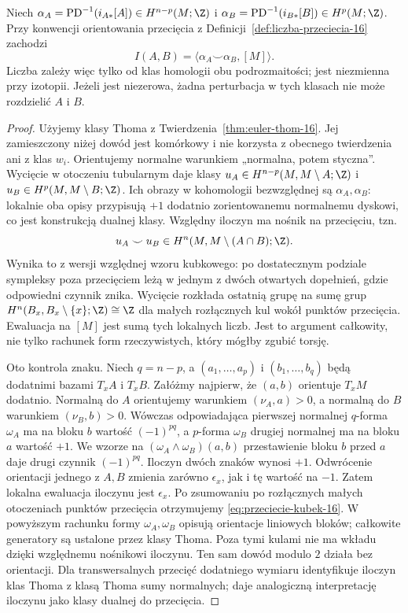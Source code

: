 \begin{twierdzenie}
\label{thm:przeciecie-kubek-16}
Niech $\alpha_A=\operatorname{PD}^{-1}
(i_{A*}[A])\in H^{n-p}(M;\Z)$
i $\alpha_B=\operatorname{PD}^{-1}
(i_{B*}[B])\in H^p(M;\Z)$.
Przy konwencji orientowania przecięcia
z Definicji~\ref{def:liczba-przeciecia-16}
zachodzi
\begin{equation}\label{eq:przeciecie-kubek-16}
 I(A,B)=
 \langle\alpha_A\smile\alpha_B,[M]\rangle.
\end{equation}
Liczba zależy więc tylko od klas
homologii obu podrozmaitości;
jest niezmienna przy izotopii.
Jeżeli jest niezerowa, żadna
perturbacja w tych klasach nie
może rozdzielić $A$ i $B$.
\end{twierdzenie}
\begin{proof}
Użyjemy klasy Thoma z Twierdzenia~\ref{thm:euler-thom-16}.
Jej zamieszczony niżej dowód jest komórkowy i nie
korzysta z obecnego twierdzenia ani z klas $w_i$.
Orientujemy normalne warunkiem „normalna, potem styczna”.
Wycięcie w otoczeniu tubularnym daje klasy
$u_A\in H^{n-p}(M,M\setminus A;\Z)$ i
$u_B\in H^p(M,M\setminus B;\Z)$.
Ich obrazy w kohomologii bezwzględnej są $\alpha_A,\alpha_B$:
lokalnie oba opisy przypisują $+1$ dodatnio zorientowanemu
normalnemu dyskowi, co jest konstrukcją dualnej klasy.
Względny iloczyn ma nośnik na przecięciu, tzn.
\[
 u_A\smile u_B\in H^n(M,M\setminus(A\cap B);\Z).
\]
Wynika to z wersji względnej wzoru kubkowego:
po dostatecznym podziale sympleksy poza przecięciem
leżą w jednym z dwóch otwartych dopełnień,
gdzie odpowiedni czynnik znika.
Wycięcie rozkłada ostatnią grupę na sumę grup
$H^n(B_x,B_x\setminus\{x\};\Z)\cong\Z$
dla małych rozłącznych kul wokół punktów przecięcia.
Ewaluacja na $[M]$ jest sumą tych lokalnych liczb.
Jest to argument całkowity, nie tylko rachunek form
rzeczywistych, który mógłby zgubić torsję.

Oto kontrola znaku.
Niech $q=n-p$, a
$(a_1,\ldots,a_p)$
i $(b_1,\ldots,b_q)$
będą dodatnimi
bazami $T_xA$ i $T_xB$.
Załóżmy najpierw,
że $(a,b)$ orientuje
$T_xM$ dodatnio.
Normalną do $A$
orientujemy warunkiem
$(\nu_A,a)>0$,
a normalną do $B$
warunkiem
$(\nu_B,b)>0$.
Wówczas odpowiadająca
pierwszej normalnej
$q$-forma $\omega_A$
ma na bloku $b$
wartość $(-1)^{pq}$,
a $p$-forma $\omega_B$
drugiej normalnej
ma na bloku $a$
wartość $+1$.
We wzorze na
$(\omega_A\wedge\omega_B)(a,b)$
przestawienie bloku
$b$ przed $a$
daje drugi czynnik
$(-1)^{pq}$.
Iloczyn dwóch znaków
wynosi $+1$.
Odwrócenie orientacji
jednego z $A,B$
zmienia zarówno
$\epsilon_x$, jak
i tę wartość na $-1$.
Zatem lokalna ewaluacja
iloczynu jest $\epsilon_x$.
Po zsumowaniu po rozłącznych
małych otoczeniach punktów
przecięcia otrzymujemy
\eqref{eq:przeciecie-kubek-16}.
W powyższym rachunku formy $\omega_A,\omega_B$
opisują orientacje liniowych bloków; całkowite
generatory są ustalone przez klasy Thoma.
Poza tymi kulami nie ma wkładu dzięki względnemu
nośnikowi iloczynu. Ten sam dowód modulo $2$
działa bez orientacji. Dla transwersalnych przecięć
dodatniego wymiaru identyfikuje iloczyn klas Thoma
z klasą Thoma sumy normalnych; daje analogiczną
interpretację iloczynu jako klasy dualnej do przecięcia.


\end{proof}
